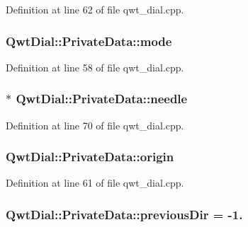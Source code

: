 Definition at line 62 of file qwt\-\_\-dial.\-cpp.

\hypertarget{class_qwt_dial_1_1_private_data_a53d47e460b05f3751278974c78908b69}{
\subsubsection[{mode}]{ Qwt\-Dial\-::\-Private\-Data\-::mode}}\label{class_qwt_dial_1_1_private_data_a53d47e460b05f3751278974c78908b69}


Definition at line 58 of file qwt\-\_\-dial.\-cpp.

\hypertarget{class_qwt_dial_1_1_private_data_ad14fef8a7b7c1bd0bf97fb76a367b9b5}{
\subsubsection[{needle}]{$\ast$ Qwt\-Dial\-::\-Private\-Data\-::needle}}\label{class_qwt_dial_1_1_private_data_ad14fef8a7b7c1bd0bf97fb76a367b9b5}


Definition at line 70 of file qwt\-\_\-dial.\-cpp.

\hypertarget{class_qwt_dial_1_1_private_data_ae0c2d2e1ecc4469968f240cbf7107f64}{
\subsubsection[{origin}]{ Qwt\-Dial\-::\-Private\-Data\-::origin}}\label{class_qwt_dial_1_1_private_data_ae0c2d2e1ecc4469968f240cbf7107f64}


Definition at line 61 of file qwt\-\_\-dial.\-cpp.

\hypertarget{class_qwt_dial_1_1_private_data_a21639a25d552713c2e48494424f4790b}{
\subsubsection[{previous\-Dir}]{ Qwt\-Dial\-::\-Private\-Data\-::previous\-Dir = -\/1.\hspace{0.3cm}{\ttfamily [static]}}}\label{class_qwt_dial_1_1_private_data_a21639a25d552713c2e48494424f4790b}


